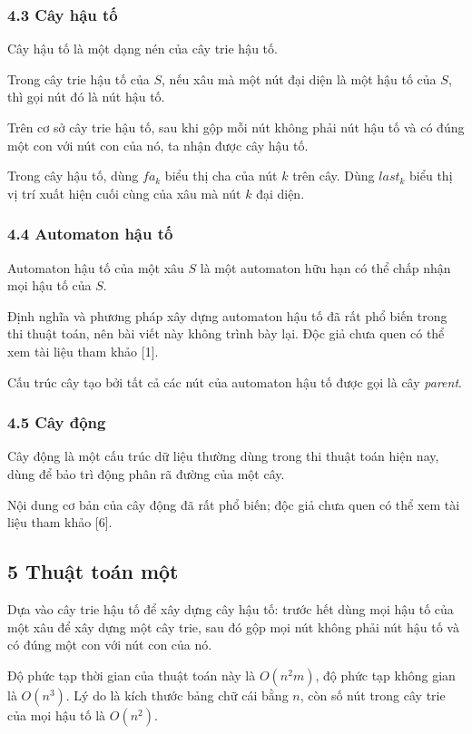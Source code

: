 \documentclass[11pt]{article}
\begin{document}
\subsubsection*{4.3 Cây hậu tố}

Cây hậu tố là một dạng nén của cây trie hậu tố.

Trong cây trie hậu tố của \(S\), nếu xâu mà một nút đại diện là một hậu tố của
\(S\), thì gọi nút đó là nút hậu tố.

Trên cơ sở cây trie hậu tố, sau khi gộp mỗi nút không phải nút hậu tố và có
đúng một con với nút con của nó, ta nhận được cây hậu tố.

Trong cây hậu tố, dùng \(fa_k\) biểu thị cha của nút \(k\) trên cây. Dùng
\(last_k\) biểu thị vị trí xuất hiện cuối cùng của xâu mà nút \(k\) đại diện.

\subsubsection*{4.4 Automaton hậu tố}

Automaton hậu tố của một xâu \(S\) là một automaton hữu hạn có thể chấp nhận mọi
hậu tố của \(S\).

Định nghĩa và phương pháp xây dựng automaton hậu tố đã rất phổ biến trong thi
thuật toán, nên bài viết này không trình bày lại. Độc giả chưa quen có thể xem
tài liệu tham khảo [1].

Cấu trúc cây tạo bởi tất cả các nút của automaton hậu tố được gọi là cây
\emph{parent}.

\subsubsection*{4.5 Cây động}

Cây động là một cấu trúc dữ liệu thường dùng trong thi thuật toán hiện nay, dùng
để bảo trì động phân rã đường của một cây.

Nội dung cơ bản của cây động đã rất phổ biến; độc giả chưa quen có thể xem tài
liệu tham khảo [6].

\subsection*{5 Thuật toán một}

Dựa vào cây trie hậu tố để xây dựng cây hậu tố: trước hết dùng mọi hậu tố của
một xâu để xây dựng một cây trie, sau đó gộp mọi nút không phải nút hậu tố và
có đúng một con với nút con của nó.

Độ phức tạp thời gian của thuật toán này là \(O(n^2m)\), độ phức tạp không gian
là \(O(n^3)\). Lý do là kích thước bảng chữ cái bằng \(n\), còn số nút trong cây
trie của mọi hậu tố là \(O(n^2)\).
\end{document}
